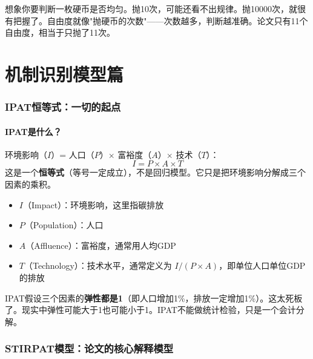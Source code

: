 \documentclass[12pt, a4paper]{article}
\begin{document}
\begin{examplebox}[类比]
想象你要判断一枚硬币是否均匀。抛10次，可能还看不出规律。抛10000次，就很有把握了。自由度就像"抛硬币的次数"——次数越多，判断越准确。论文只有11个自由度，相当于只抛了11次。
\end{examplebox}

\part{机制识别模型篇}

\section{IPAT恒等式：一切的起点}

\subsection{IPAT是什么？}

\begin{conceptbox}[IPAT恒等式]
环境影响（$I$）= 人口（$P$）$\times$ 富裕度（$A$）$\times$ 技术（$T$）：
\[
I = P \times A \times T
\]
这是一个\textbf{恒等式}（等号一定成立），不是回归模型。它只是把环境影响分解成三个因素的乘积。
\end{conceptbox}

\begin{itemize}[leftmargin=2em]
\item $I$（Impact）：环境影响，这里指碳排放
\item $P$（Population）：人口
\item $A$（Affluence）：富裕度，通常用人均GDP
\item $T$（Technology）：技术水平，通常定义为 $I/(P \times A)$，即单位人口单位GDP的排放
\end{itemize}

\begin{warningbox}[IPAT的局限]
IPAT假设三个因素的\textbf{弹性都是1}（即人口增加1\%，排放一定增加1\%）。这太死板了。现实中弹性可能大于1也可能小于1。IPAT不能做统计检验，只是一个会计分解。
\end{warningbox}

\section{STIRPAT模型：论文的核心解释模型}
\end{document}
